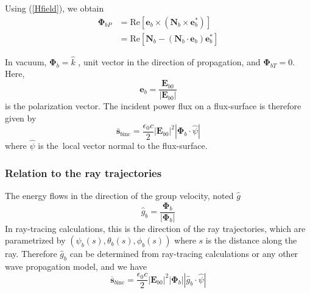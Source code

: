 Using (\ref{Hfield}), we obtain
\begin{align}
\mathbf{\Phi}_{bP}  &  =\text{Re}\left[  \mathbf{e}_{b}\times\left(
\mathbf{N}_{b}\times\mathbf{e}_{b}^{\ast}\right)  \right] \nonumber\\
&  =\text{Re}\left[  \mathbf{N}_{b}-\left(  \mathbf{N}_{b}\cdot\mathbf{e}%
_{b}\right)  \mathbf{e}_{b}^{\ast}\right]  \label{phibp2}%
\end{align}

In vacuum, $\mathbf{\Phi}_{b}=\widehat{k}$ , unit vector in the direction of
propagation, and $\mathbf{\Phi}_{bT}=0$. Here,
\begin{equation}
\mathbf{e}_{b}=\frac{\mathbf{E}_{b0}}{\left|  \mathbf{E}_{b0}\right|  }%
\end{equation}
is the polarization vector. The incident power flux on a flux-surface is
therefore given by
\begin{equation}
\overline{\mathbf{s}}_{b\text{inc}}=\frac{\epsilon_{0}c}{2}\left|
\mathbf{E}_{b0}\right|  ^{2}\left|  \mathbf{\Phi}_{b}\cdot\widehat{\psi
}\right|
\end{equation}
where $\widehat{\psi}$ is the\ local vector normal to the flux-surface.

\subsubsection{Relation to the ray trajectories}

\bigskip The energy flows in the direction of the group velocity, noted
$\widehat{g}$%
\begin{equation}
\widehat{g}_{b}=\frac{\mathbf{\Phi}_{b}}{\left|  \mathbf{\Phi}_{b}\right|  }%
\end{equation}
In ray-tracing calculations, this is the direction of the ray trajectories,
which are parametrized by $\left(  \psi_{b}\left(  s\right)  ,\theta
_{b}\left(  s\right)  ,\phi_{b}\left(  s\right)  \right)  $ where $s$ is the
distance along the ray. Therefore $\widehat{g}_{b}$ can be determined from
ray-tracing calculations or any other wave propagation model, and we have
\begin{equation}
\overline{\mathbf{s}}_{b\text{inc}}=\frac{\epsilon_{0}c}{2}\left|
\mathbf{E}_{b0}\right|  ^{2}\left|  \mathbf{\Phi}_{b}\right|  \left|
\widehat{g}_{b}\cdot\widehat{\psi}\right|
\end{equation}

